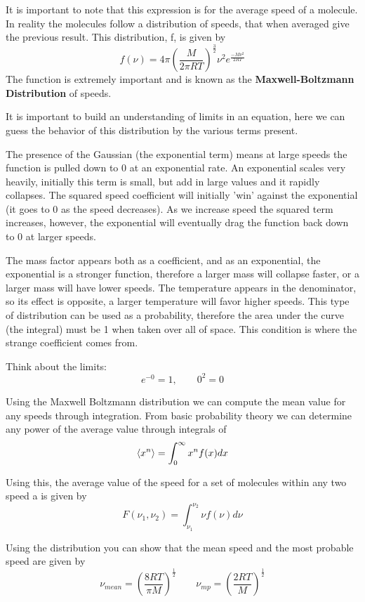 \documentclass{article}
\newcommand{\be}{\begin{equation}}
\newcommand{\ee}{\end{equation}}
\begin{document}
It is important to note that this expression is for the average speed of a molecule.
In reality the molecules follow a distribution of speeds, that when averaged give the previous result. 
This distribution, f, is given by 
\be
f(\nu) = 4\pi \left(\frac{M}{2\pi RT}\right)^{\frac{3}{2}} \nu^2 e^{\frac{-M\nu^2}{2RT}}
\ee
The function is extremely important and is known as the \textbf{Maxwell-Boltzmann Distribution} of speeds. 

It is important to build an understanding of limits in an equation, here we can guess the behavior of this distribution by the various terms present. 

The presence of the Gaussian (the exponential term) means at large speeds the function is pulled down to 0 at an exponential rate. 
An exponential scales very heavily, initially this term is small, but add in large values and it rapidly collapses. 
The squared speed coefficient will initially 'win' against the exponential (it goes to 0 as the speed decreases).
As we increase speed the squared term increases, however, the exponential will eventually drag the function back down to 0 at larger speeds. 

The mass factor appears both as a coefficient, and as an exponential, the exponential is a stronger function, therefore a larger mass will collapse faster, or a larger mass will have lower speeds. 
The temperature appears in the denominator, so its effect is opposite, a larger temperature will favor higher speeds. 
This type of distribution can be used as a probability, therefore the area under the curve (the integral) must be 1 when taken over all of space. 
This condition is where the strange coefficient comes from. 

Think about the limits:
\be
e^{-0} = 1, \qquad 0^2 = 0
\ee

Using the Maxwell Boltzmann distribution we can compute the mean value for any speeds through integration. 
From basic probability theory we can determine any power of the average value through integrals of 
\be
\braket{x^n} = \int_0^\infty x^n f(x) dx
\ee

Using this, the average value of the speed for a set of molecules within any two speed a is given by 
\be
F(\nu_1,\nu_2) = \int_{\nu_1}^{\nu_2} \nu f(\nu)d\nu
\ee

Using the distribution you can show that the mean speed and the most probable speed are given by
\be
\nu_{mean} = \left(\frac{8RT}{\pi M}\right)^{\frac{1}{2}} \qquad \nu_{mp} = \left(\frac{2RT}{M}\right)^{\frac{1}{2}}
\ee
\end{document}
